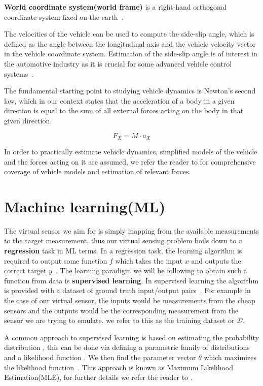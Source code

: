 \documentclass[../main.tex]{subfiles}
\begin{document}
\textbf{World coordinate system(world frame)} is a right-hand orthogonal coordinate system fixed on the earth~\citep{gill2000vehicle}.

The velocities of the vehicle can be used to compute the side-slip angle, which is defined as the angle between the longitudinal axis and the vehicle velocity vector in the vehicle coordinate system. Estimation of the side-slip angle is of interest in the automotive industry as it is crucial for some advanced vehicle control systems~\citep{jin2017vehicle}. 

The fundamental starting point to studying vehicle dynamics is Newton's second law, which in our context states that the acceleration of a body in a given direction is equal to the sum of all external forces acting on the  body in that given direction. 

\begin{equation}
    F_X = M \cdot a_X
\end{equation}{}

In order to practically estimate vehicle dynamics, simplified models of the vehicle and the forces acting on it are assumed, we refer the reader to \cite{schramm2014vehicle} for comprehensive coverage of vehicle models and estimation of relevant forces.

\section{Machine learning(ML)}

The virtual sensor we aim for is simply mapping from the available measurements to the target measurement, thus our virtual sensing problem boils down to a \textbf{regression} task in ML terms. In a regression task, the learning algorithm is required to output some function $f$ which takes the input $x$ and outputs the correct target $y$~\citep[chapter~5]{goodfellow2016deep}. The learning paradigm we will be following to obtain such a function from data is \textbf{supervised learning}. In supervised learning the algorithm is provided with a dataset of ground truth input/output pairs~\citep[chapter~5]{goodfellow2016deep}. For example in the case of our virtual sensor, the inputs would be measurements from the cheap sensors and the outputs would be the corresponding measurement from the sensor we are trying to emulate. we refer to this as the training dataset or $\mathcal{D}$. 

A common approach to supervised learning is based on estimating the probability distribution , this can be done via defining a parametric family of distributions  and a likelihood function . We then find the parameter vector $\theta$ which maximizes the likelihood function~\citep[chapter~5]{goodfellow2016deep}. This approach is known as Maximum Likelihood Estimation(MLE), for further details we refer the reader to \cite[chapter~5]{goodfellow2016deep}. 
\end{document}
